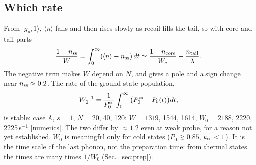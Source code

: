 \documentclass[11pt,a4paper]{article}
\newcommand{\ket}[1]{|#1\rangle}
\begin{document}
\subsection{Which rate}
\label{sec:W0}\hypertarget{d:W0}{}
From $\ket{g_p,1}$, $\langle n\rangle$ falls and then rises slowly as recoil fills the tail, so with core and tail parts
\begin{equation}
  \frac{1-n_{\rm ss}}{W}=\int_0^\infty(\langle n\rangle-n_{\rm ss})\,dt\simeq\frac{1-n_{\rm core}}{W_c}-\frac{n_{\rm tail}}{\lambda}.
\end{equation}
The negative term makes $W$ depend on $N$, and gives a pole and a sign change near $n_{\rm ss}\approx0.2$. The rate of the ground-state population,
\begin{equation}
  W_0^{-1}=\frac{1}{P_0^{\rm ss}}\int_0^\infty\big(P_0^{\rm ss}-P_0(t)\big)dt,
\end{equation}
is stable: case A, $s=1$, $N=20$, 40, 120: $W=1319$, 1544, 1614, $W_0=2188$, 2220, 2225\,s$^{-1}$ [numerics]. The two differ by $\approx1.2$ even at weak probe, for a reason not yet established. $W_0$ is meaningful only for cold states ($P_0\gtrsim0.85$, $n_{\rm ss}<1$). It is the time scale of the last phonon, not the preparation time: from thermal states the times are many times $1/W_0$ (Sec.~\ref{sec:prep}).
\end{document}
